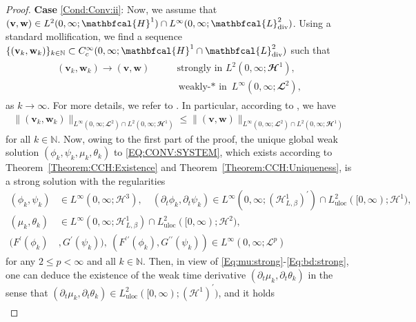 \documentclass[10pt,reqno]{amsart}
\theoremstyle{remark}
\numberwithin{equation}{section}
\newcommand{\norm}[1]{\| #1 \|}
\newcommand{\N}{\mathbb N}
\newcommand{\bv}{\mathbf{v}}
\newcommand{\bw}{\mathbf{w}}
\newcommand{\delt}{\partial_{t}}
\newcommand{\Div}{\textnormal{div}}
\begin{document}
\begin{proof}
\textbf{Case }\ref{Cond:Conv:ii}: Now, we assume that $(\bv,\bw)\in L^2(0,\infty;\mathbfcal{H}^1)\cap L^\infty(0,\infty;\mathbfcal{L}^2_\Div)$. Using a standard mollification, we find a sequence $\{(\bv_k,\bw_k)\}_{k\in\N}\subset C_c^\infty(0,\infty;\mathbfcal{H}^1\cap\mathbfcal{L}^2_\Div)$ such that 
\begin{align}\label{Conv:vw:ep}
    \begin{split}
        (\mathbf{v}_k,\mathbf{w}_k) \rightarrow (\mathbf{v},\mathbf{w}) &\qquad\text{strongly in~} L^2(0,\infty;\mathbfcal{H}^1), \\
        &\qquad\text{weakly-$\ast$ in~} L^\infty(0,\infty;\mathbfcal{L}^2),
    \end{split}
\end{align}
as $k\rightarrow\infty$. For more details, we refer to \cite[S.~4.13-4.15]{Alt2016}.
In particular, according to \cite[S.~4.13 (2)]{Alt2016}, we have
\begin{align}\label{Est:vw:ep}
    \norm{(\mathbf{v}_k,\mathbf{w}_k)}_{L^\infty(0,\infty;\mathbfcal{L}^2)\cap L^2(0,\infty;\mathbfcal{H}^1)} 
    \leq \norm{(\mathbf{v},\mathbf{w})}_{L^\infty(0,\infty;\mathbfcal{L}^2)\cap L^2(0,\infty;\mathbfcal{H}^1)} 
\end{align}
for all $k\in\N$.
Now, owing to the first part of the proof, the unique global weak solution $(\phi_k,\psi_k,\mu_k,\theta_k)$ to \eqref{EQ:CONV:SYSTEM}, which exists according to Theorem~\ref{Theorem:CCH:Existence} and Theorem~\ref{Theorem:CCH:Uniqueness}, is a strong solution with the regularities
\begin{align*}
    (\phi_k,\psi_k)&\in L^\infty(0,\infty;\mathcal{H}^3), \quad (\delt\phi_k,\delt\psi_k)\in L^\infty(0,\infty;(\mathcal{H}^1_{L,\beta})^\prime)\cap L^2_{\mathrm{uloc}}([0,\infty);\mathcal{H}^1), \\
    (\mu_k,\theta_k)&\in L^\infty(0,\infty;\mathcal{H}^1_{L,\beta})\cap L^2_{\mathrm{uloc}}([0,\infty);\mathcal{H}^2), \\
    (F^\prime(\phi_k)&,G^\prime(\psi_k)), \ (F^{\prime\prime}(\phi_k), G^{\prime\prime}(\psi_k))\in L^\infty(0,\infty;\mathcal{L}^p)
\end{align*}
for any $2 \leq p < \infty$ and all $k\in\N$. Then, in view of \eqref{Eq:mu:strong}-\eqref{Eq:bd:strong}, one can deduce the existence of the weak time derivative $(\delt\mu_k,\delt\theta_k)$ in the sense that $(\delt\mu_k,\delt\theta_k)\in L^2_{\mathrm{uloc}}([0,\infty);(\mathcal{H}^1)^\prime)$, and it holds
\begin{align}\label{WF:DELT:MT}

\end{align}
\end{proof}
\end{document}
